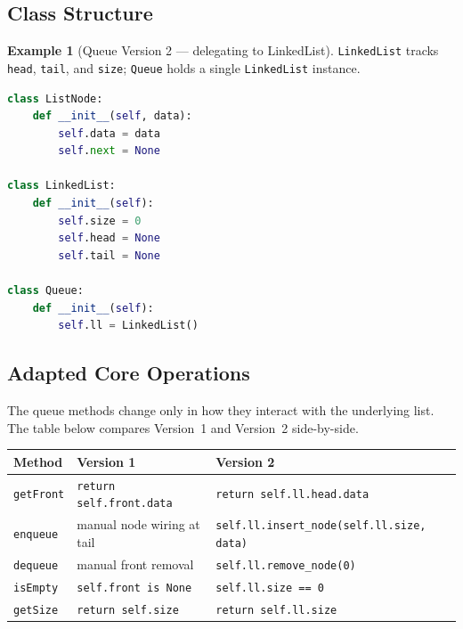 \documentclass[11pt, a4paper, notitlepage]{report}
\theoremstyle{definition}
\theoremstyle{remark}
\theoremstyle{definition}
\newtheorem{example}[theorem]{Example}
\begin{document}
\subsection{Class Structure}
\label{subsec:queue-v2-classes}

\begin{example}[Queue Version 2 --- delegating to LinkedList]
\label{ex:queue-v2-structure}
\texttt{LinkedList} tracks \texttt{head}, \texttt{tail}, and \texttt{size}; \texttt{Queue}
holds a single \texttt{LinkedList} instance.
\begin{lstlisting}[language=Python]
class ListNode:
    def __init__(self, data):
        self.data = data
        self.next = None

class LinkedList:
    def __init__(self):
        self.size = 0
        self.head = None
        self.tail = None

class Queue:
    def __init__(self):
        self.ll = LinkedList()
\end{lstlisting}
\end{example}

\subsection{Adapted Core Operations}
\label{subsec:queue-v2-ops}

The queue methods change only in how they interact with the underlying list.  The table below
compares Version~1 and Version~2 side-by-side.

\begin{center}
\begin{tabularx}{\linewidth}{@{} l X X @{}}
\toprule
\textbf{Method} & \textbf{Version 1} & \textbf{Version 2} \\
\midrule
\texttt{getFront} & \texttt{return self.front.data} & \texttt{return self.ll.head.data} \\
\texttt{enqueue}  & manual node wiring at tail & \texttt{self.ll.insert\_node(self.ll.size, data)} \\
\texttt{dequeue}  & manual front removal & \texttt{self.ll.remove\_node(0)} \\
\texttt{isEmpty}  & \texttt{self.front is None} & \texttt{self.ll.size == 0} \\
\texttt{getSize}  & \texttt{return self.size} & \texttt{return self.ll.size} \\
\bottomrule
\end{tabularx}
\end{center}
\end{document}
